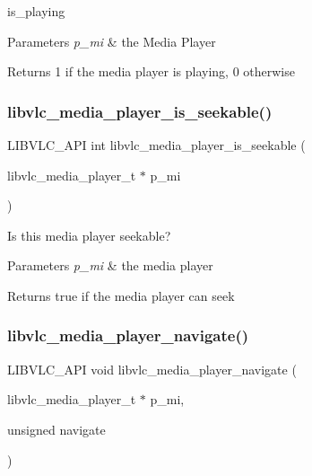 is\+\_\+playing


\begin{DoxyParams}{Parameters}
{\em p\+\_\+mi} & the Media Player \\
\hline
\end{DoxyParams}
\begin{DoxyReturn}{Returns}
1 if the media player is playing, 0 otherwise
\end{DoxyReturn}
\mbox{\label{group__libvlc__media__player_gaf39dbbcb37cd5bcc3cdf203de8e117e3}} 
\subsubsection{\texorpdfstring{libvlc\+\_\+media\+\_\+player\+\_\+is\+\_\+seekable()}{libvlc\_media\_player\_is\_seekable()}}
{\footnotesize\ttfamily L\+I\+B\+V\+L\+C\+\_\+\+A\+PI int libvlc\+\_\+media\+\_\+player\+\_\+is\+\_\+seekable (\begin{DoxyParamCaption}\item[{libvlc\+\_\+media\+\_\+player\+\_\+t $\ast$}]{p\+\_\+mi }\end{DoxyParamCaption})}

Is this media player seekable?


\begin{DoxyParams}{Parameters}
{\em p\+\_\+mi} & the media player \\
\hline
\end{DoxyParams}
\begin{DoxyReturn}{Returns}
true if the media player can seek
\end{DoxyReturn}
\mbox{\label{group__libvlc__media__player_ga8fe3bb8a48af33a012040196b0953a93}} 
\subsubsection{\texorpdfstring{libvlc\+\_\+media\+\_\+player\+\_\+navigate()}{libvlc\_media\_player\_navigate()}}
{\footnotesize\ttfamily L\+I\+B\+V\+L\+C\+\_\+\+A\+PI void libvlc\+\_\+media\+\_\+player\+\_\+navigate (\begin{DoxyParamCaption}\item[{libvlc\+\_\+media\+\_\+player\+\_\+t $\ast$}]{p\+\_\+mi,  }\item[{unsigned}]{navigate }\end{DoxyParamCaption})}

